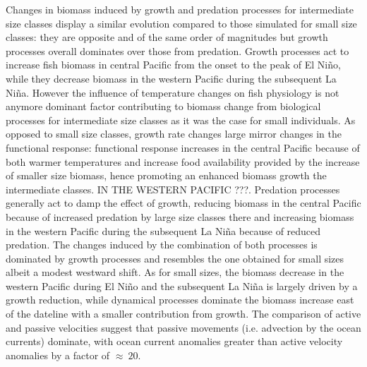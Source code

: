 Changes in biomass induced by growth and predation processes for intermediate size classes display a similar evolution compared to those simulated for small size classes: they are opposite and of the same order of magnitudes but growth processes overall dominates over those from predation. Growth processes act to increase fish biomass in central Pacific from the onset to the peak of El Niño, while they decrease biomass in the western Pacific during the subsequent La Niña. However the influence of temperature changes on fish physiology is not anymore dominant factor contributing to biomass change from biological processes for intermediate size classes as it was the case for small individuals. As opposed to small size classes, growth rate changes large mirror changes in the functional response: functional response increases in the central Pacific because of both warmer temperatures and increase food availability provided by the increase of smaller size biomass, hence promoting an enhanced biomass growth the intermediate classes. IN THE WESTERN PACIFIC ???. Predation processes generally act to damp the effect of growth, reducing biomass in the central Pacific because of increased predation by large size classes there and increasing biomass in the western Pacific during the subsequent La Niña because of reduced predation. The changes induced by the combination of both processes is dominated by growth processes and resembles the one obtained for small sizes albeit a modest westward shift. As for small sizes, the biomass decrease in the western Pacific during El Niño and the subsequent La Niña is largely driven by a growth reduction, while dynamical processes dominate the biomass increase east of the dateline with a smaller contribution from growth.  The comparison of active and passive velocities suggest that passive movements (i.e. advection by the ocean currents) dominate, with ocean current anomalies greater than active velocity anomalies by a factor of $\approx\ 20$.


